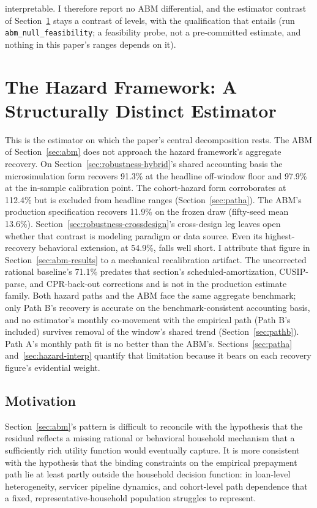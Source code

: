 \documentclass[12pt]{article}
\begin{document}
interpretable. I therefore report no ABM differential, and the estimator contrast of Section~\ref{sec:hazard} stays a contrast of levels, with the qualification that entails (run \texttt{abm\_null\_feasibility}; a feasibility probe, not a pre-committed estimate, and nothing in this paper's ranges depends on it).
\section{The Hazard Framework: A Structurally Distinct Estimator}\label{sec:hazard}

This is the estimator on which the paper's central decomposition rests. The ABM of Section~\ref{sec:abm} does not approach the hazard framework's aggregate recovery. On Section~\ref{sec:robustness-hybrid}'s shared accounting basis the microsimulation form recovers 91.3\% at the headline off-window floor and 97.9\% at the in-sample calibration point. The cohort-hazard form corroborates at 112.4\% but is excluded from headline ranges (Section~\ref{sec:patha}). The ABM's production specification recovers 11.9\% on the frozen draw (fifty-seed mean 13.6\%). Section~\ref{sec:robustness-crossdesign}'s cross-design leg leaves open whether that contrast is modeling paradigm or data source. Even its highest-recovery behavioral extension, at 54.9\%, falls well short. I attribute that figure in Section~\ref{sec:abm-results} to a mechanical recalibration artifact. The uncorrected rational baseline's 71.1\% predates that section's scheduled-amortization, CUSIP-parse, and CPR-back-out corrections and is not in the production estimate family. Both hazard paths and the ABM face the same aggregate benchmark; only Path B's recovery is accurate on the benchmark-consistent accounting basis, and no estimator's monthly co-movement with the empirical path (Path B's included) survives removal of the window's shared trend (Section~\ref{sec:pathb}). Path A's monthly path fit is no better than the ABM's. Sections~\ref{sec:patha} and~\ref{sec:hazard-interp} quantify that limitation because it bears on each recovery figure's evidential weight.

\subsection{Motivation}\label{sec:hazard-motivation}

Section~\ref{sec:abm}'s pattern is difficult to reconcile with the hypothesis that the residual reflects a missing rational or behavioral household mechanism that a sufficiently rich utility function would eventually capture. It is more consistent with the hypothesis that the binding constraints on the empirical prepayment path lie at least partly outside the household decision function: in loan-level heterogeneity, servicer pipeline dynamics, and cohort-level path dependence that a fixed, representative-household population struggles to represent.
\end{document}
